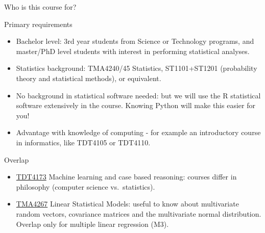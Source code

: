 \documentclass[
  10pt,
  ignorenonframetext,
]{beamer}
\providecommand{\tightlist}{%
  \setlength{\itemsep}{0pt}\setlength{\parskip}{0pt}}
\begin{document}
\begin{frame}{Who is this course for?}
\protect\hypertarget{who-is-this-course-for}{}
\begin{block}{Primary requirements}
\protect\hypertarget{primary-requirements}{}
\(~\)

\begin{itemize}
\tightlist
\item
  Bachelor level: 3rd year students from Science or Technology programs,
  and master/PhD level students with interest in performing statistical
  analyses.
\end{itemize}

\vspace{2mm}

\begin{itemize}
\tightlist
\item
  Statistics background: TMA4240/45 Statistics, ST1101+ST1201
  (probability theory and statistical methods), or equivalent.
\end{itemize}

\vspace{2mm}

\begin{itemize}
\tightlist
\item
  No background in statistical software needed: but we will use the R
  statistical software extensively in the course. Knowing Python will
  make this easier for you!
\end{itemize}

\vspace{2mm}

\begin{itemize}
\tightlist
\item
  Advantage with knowledge of computing - for example an introductory
  course in informatics, like TDT4105 or TDT4110.
\end{itemize}
\end{block}
\end{frame}

\begin{frame}
\begin{block}{Overlap}
\protect\hypertarget{overlap}{}
\vspace{2mm}

\begin{itemize}
\tightlist
\item
  \href{https://www.ntnu.no/studier/emner/TDT4173\#tab=omEmnet}{TDT4173}
  Machine learning and case based reasoning: courses differ in
  philosophy (computer science vs.~statistics).
\end{itemize}

\vspace{2mm}

\begin{itemize}
\tightlist
\item
  \href{https://www.ntnu.no/studier/emner/TMA4267\#tab=omEmnet}{TMA4267}
  Linear Statistical Models: useful to know about multivariate random
  vectors, covariance matrices and the multivariate normal distribution.
  Overlap only for multiple linear regression (M3).
\end{itemize}
\end{block}
\end{frame}
\end{document}
